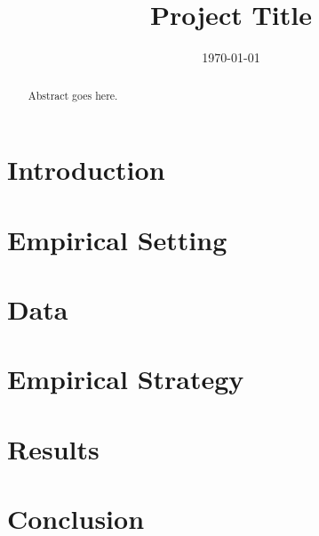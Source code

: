 \documentclass[12pt]{article}
\title{Project Title}
\author{}
\date{\today}
\begin{document}
\maketitle

\begin{abstract}
Abstract goes here.
\end{abstract}

\section{Introduction}

\section{Empirical Setting}

\section{Data}

\section{Empirical Strategy}

\section{Results}

% 
% 

\section{Conclusion}



\end{document}

